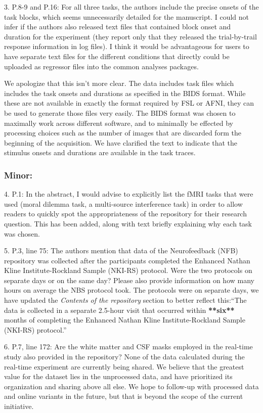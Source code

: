 \documentclass{article}
\newcommand{\RESPONSE}[1]{\textcolor{responseblue}{#1}}
\begin{document}
3. P.8-9 and P.16: For all three tasks, the authors include the precise onsets of the task blocks, which seems unnecessarily detailed for the manuscript. I could not infer if the authors also released text files that contained block onset and duration for the experiment (they report only that they released the trial-by-trail response information in log files). I think it would be advantageous for users to have separate text files for the different conditions that directly could be uploaded as regressor files into the common analyses packages.

\RESPONSE{We apologize that this isn't more clear. The data includes task files which includes the task onsets and durations as specified in the BIDS format. While these are not available in exactly the format required by FSL or AFNI, they can be used to generate those files very easily. The BIDS format was chosen to maximally work across different software, and to minimally be effected by processing choices such as the number of images that are discarded form the beginning of the acquisition. We have clarified the text to indicate that the stimulus onsets and durations are available in the task traces.}

\subsubsection*{Minor:}
4. P.1: In the abstract, I would advise to explicitly list the fMRI tasks that were used (moral dilemma task, a multi-source interference task) in order to allow readers to quickly spot the appropriateness of the repository for their research question.
\RESPONSE{This has been added, along with text briefly explaining why each task was chosen.}

5. P.3, line 75: The authors mention that data of the Neurofeedback (NFB) repository was collected after the participants completed the Enhanced Nathan Kline Institute-Rockland Sample (NKI-RS) protocol. Were the two protocols on separate days or on the same day? Please also provide information on how many hours on average the NBS protocol took.
\RESPONSE{The protocols were on separate days, we have updated the \emph{Contents of the repository} section to better reflect this:``The data is collected in a separate 2.5-hour visit that occurred within \textbf{**six**} months of completing the Enhanced Nathan Kline Institute-Rockland Sample (NKI-RS) protocol.''}

6. P.7, line 172: Are the white matter and CSF masks employed in the real-time study also provided in the repository?
\RESPONSE{None of the data calculated during the real-time experiment are currently being shared. We believe that the greatest value for the dataset lies in the unprocessed data, and have prioritized its organization and sharing above all else. We hope to follow-up with processed data and online variants in the future, but that is beyond the scope of the current initiative.}
\end{document}
